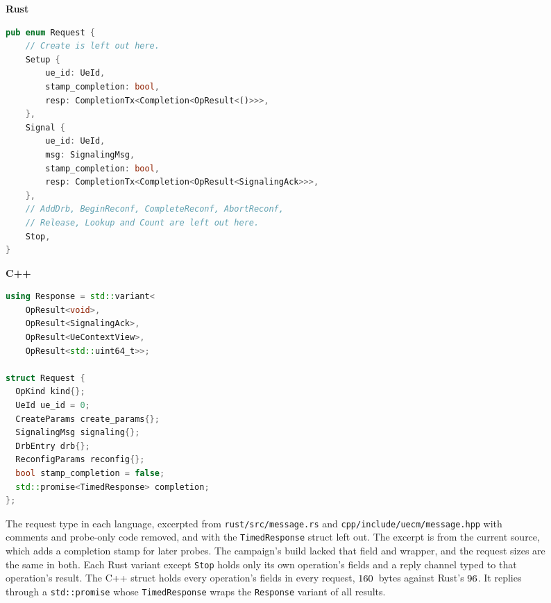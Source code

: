 \documentclass[english,oneside,a4paper,censored,csm,software-track-2020]{HYthesisML}
\begin{document}
\begin{figure}[!tbp]
\centering
\begin{minipage}[t]{0.595\linewidth}
{\footnotesize\textbf{Rust}}
\begin{lstlisting}[language=Rust]
pub enum Request {
    // Create is left out here.
    Setup {
        ue_id: UeId,
        stamp_completion: bool,
        resp: CompletionTx<Completion<OpResult<()>>>,
    },
    Signal {
        ue_id: UeId,
        msg: SignalingMsg,
        stamp_completion: bool,
        resp: CompletionTx<Completion<OpResult<SignalingAck>>>,
    },
    // AddDrb, BeginReconf, CompleteReconf, AbortReconf,
    // Release, Lookup and Count are left out here.
    Stop,
}
\end{lstlisting}
\end{minipage}\hfill
\begin{minipage}[t]{0.39\linewidth}
{\footnotesize\textbf{C++}}
\begin{lstlisting}[language=C++]
using Response = std::variant<
    OpResult<void>,
    OpResult<SignalingAck>,
    OpResult<UeContextView>,
    OpResult<std::uint64_t>>;

struct Request {
  OpKind kind{};
  UeId ue_id = 0;
  CreateParams create_params{};
  SignalingMsg signaling{};
  DrbEntry drb{};
  ReconfigParams reconfig{};
  bool stamp_completion = false;
  std::promise<TimedResponse> completion;
};
\end{lstlisting}
\end{minipage}
\caption[The request type in each language]{The request type in each language,
excerpted from \texttt{rust/src/message.rs} and
\texttt{cpp/include/uecm/message.hpp} with comments and probe-only code
removed, and with the \texttt{TimedResponse} struct left out. The excerpt is from
the current source, which adds a completion stamp for later probes. The campaign's
build lacked that field and wrapper, and the request sizes are the same in both. Each Rust variant
except \texttt{Stop} holds only its own operation's fields and a reply channel
typed to that operation's result. The C++ struct holds every
operation's fields in every request, $160$~bytes against Rust's
$96$. It replies through a \texttt{std::promise} whose
\texttt{TimedResponse} wraps the \texttt{Response} variant of all
results.\label{fig:request}}
\end{figure}
\end{document}
